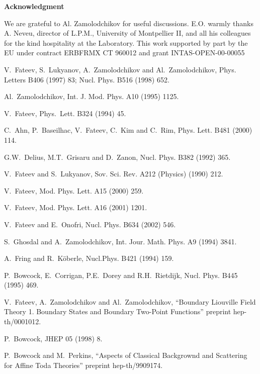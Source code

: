 \documentclass[a4paper,12pt,titlepage,final]{article}
\begin{document}
\bigskip
\begin{center}
\textbf{Acknowledgment}
\end{center}
We are grateful to Al. Zamolodchikov for useful
discussions.  E.O. warmly thanks A. Neveu, director of L.P.M.,
University of Montpellier II, and all his colleagues for the kind
hospitality at the Laboratory.  This work supported by part by the EU
under contract ERBFRMX CT 960012 and grant INTAS-OPEN-00-00055


\begin{thebibliography}{99}
  V.\ Fateev, S.\ Lukyanov, A.\ Zamolodchikov and Al.\
Zamolodchikov,
Phys. Letters B406 (1997) 83; Nucl. Phys. B516 (1998) 652.

  Al.\ Zamolodchikov, Int. J. Mod. Phys. A10 (1995) 1125.

  V.\  Fateev, Phys.\  Lett. B324 (1994) 45.

 C.\ Ahn, P.\ Baseilhac, V.\ Fateev, C.\ Kim and C.\ Rim,
Phys. Lett.  B481 (2000) 114.

  G.W.\ Delius, M.T.\ Grisaru and D.\ Zanon, Nucl. Phys.
B382 (1992)
365.

  V.\ Fateev and S.\ Lukyanov, Sov. Sci. Rev. A212 (Physics)
(1990)
212.

  V.\ Fateev, Mod. Phys. Lett. A15 (2000) 259.

  V.\ Fateev, Mod. Phys. Lett. A16 (2001) 1201.


  V.\ Fateev and E.\ Onofri, Nucl. Phys. B634 (2002) 546.

  S.\ Ghosdal and A.\ Zamolodchikov, Int. Jour. Math. Phys. A9
(1994) 3841.

  A.\ Fring and R.\ K\"{o}berle, Nucl.Phys. B421 (1994) 159.

  P.\ Bowcock, E.\ Corrigan, P.E.\ Dorey and R.H.\
Rietdijk, Nucl.
Phys. B445 (1995) 469.

  V.\ Fateev, A.\ Zamolodchikov and Al.\ Zamolodchikov,
``Boundary
Liouville Field Theory 1. Boundary States and Boundary Two-Point Functions''
preprint hep-th/0001012.

  P.\ Bowcock, JHEP 05 (1998) 8.

  P.\ Bowcock and M.\ Perkins, ``Aspects of Classical
Backgrownd
and Scattering for Affine Toda Theories'' preprint hep-th/9909174.


\end{thebibliography}
\end{document}
